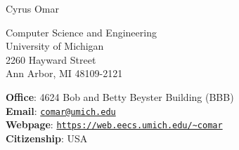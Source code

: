 \documentclass[10pt,letterpaper]{article}
\def\name{Cyrus Omar}
\renewenvironment{itemize}{
  \begin{list}{}{
    \setlength{\leftmargin}{1.25em}
    \setlength{\itemsep}{0.25em}
    \setlength{\parskip}{0pt}
    \setlength{\parsep}{0.2em}
  }
}{
  \end{list}
}
\begin{document}
{\LARGE \name}


\bigskip

\begin{minipage}[t]{0.495\textwidth}
  Computer Science and Engineering\\
  University of Michigan\\
  2260 Hayward Street\\
  Ann Arbor, MI 48109-2121
\end{minipage}
\begin{minipage}[t]{0.495\textwidth}
  \textbf{Office}: 4624 Bob and Betty Beyster Building (BBB) \\
  \textbf{Email}: \href{mailto:comar@umich.edu}{\texttt{comar@umich.edu}} \\
  \textbf{Webpage}: \href{https://web.eecs.umich.edu/~comar}{\texttt{https://web.eecs.umich.edu/\textasciitilde comar}} \\
  \textbf{Citizenship}: USA
\end{minipage}


\end{document}
